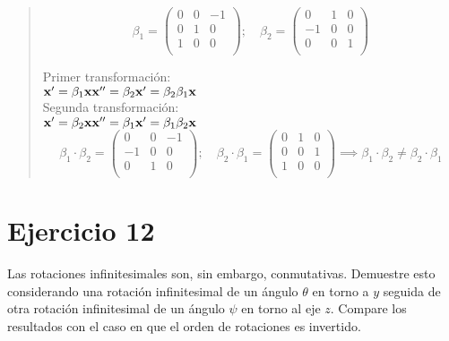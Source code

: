\documentclass[a4paper,12pt,twoside,final,spanish]{article}
\begin{document}
\dotfill
\begin{quote}
\[
\beta_{1}=\left(\begin{matrix}
0 & 0 & -1\\
0 & 1 & 0\\
1 & 0 & 0\\
\end{matrix}\right);\quad
\beta_{2}=\left(\begin{matrix}
0 & 1 & 0\\
-1 & 0 & 0\\
0 & 0 & 1\\
\end{matrix}\right)
\]

Primer transformación:\\
$\mathbf{x'}=\beta_{1}\mathbf{x}\\
\mathbf{x''}=\beta_{2}\mathbf{x'}=\beta_{2}\beta_{1}\mathbf{x}$\\

Segunda transformación:\\
$\mathbf{x'}=\beta_{2}\mathbf{x}\\
\mathbf{x''}=\beta_{1}\mathbf{x'}=\beta_{1}\beta_{2}\mathbf{x}$\\

\[
\beta_{1}\cdot\beta_{2}=\left(\begin{matrix}
0 & 0 & -1\\
-1 & 0 & 0\\
0 & 1 & 0\\
\end{matrix}\right);\quad
\beta_{2}\cdot\beta_{1}=\left(\begin{matrix}
0 & 1 & 0\\
0 & 0 & 1\\
1 & 0 & 0\\
\end{matrix}\right)\implies\beta_{1}\cdot\beta_{2}\neq\beta_{2}\cdot\beta_{1}
\]
\end{quote}
\section*{Ejercicio 12}

Las rotaciones infinitesimales son, sin embargo, conmutativas. Demuestre esto considerando una rotación infinitesimal de un ángulo $\theta$ en torno a $y$ seguida de otra rotación infinitesimal de un ángulo $\psi$ en torno al eje $z$. Compare los resultados con el caso en que el orden de rotaciones es invertido. 
\end{document}
